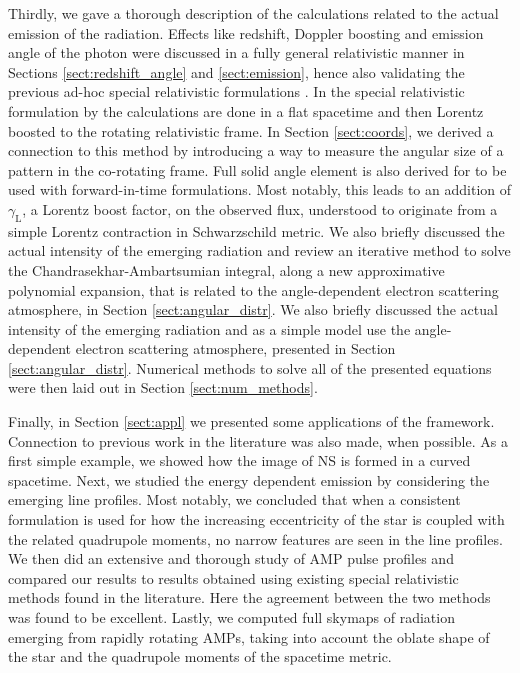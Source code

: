 \documentclass{aa}
\newcommand{\sch}{Schwarzschild }
\newcommand{\lgamma}{\gamma_{\text{L}}}
\begin{document}
Thirdly, we gave a thorough description of the calculations related to the actual emission of the radiation.
Effects like redshift, Doppler boosting and emission angle of the photon were discussed in a fully general relativistic manner in Sections \ref{sect:redshift_angle} and \ref{sect:emission}, hence also validating the previous ad-hoc special relativistic formulations \citep[see e.g.][]{PG03, PB06}.
In the special relativistic formulation by \citet{PB06} the calculations are done in a flat spacetime and then Lorentz boosted to the rotating relativistic frame.
In Section \ref{sect:coords}, we derived a connection to this method by introducing a way to measure the angular size of a pattern in the co-rotating frame.
Full solid angle element is also derived for to be used with forward-in-time formulations.
Most notably, this leads to an addition of $\lgamma$, a Lorentz boost factor, on the observed flux, understood to originate from a simple Lorentz contraction in \sch metric.
We also briefly discussed the actual intensity of the emerging radiation and review an iterative method to solve the Chandrasekhar-Ambartsumian integral, along a new approximative polynomial expansion, that is related to the angle-dependent electron scattering atmosphere, in Section \ref{sect:angular_distr}.
We also briefly discussed the actual intensity of the emerging radiation and as a simple model use the angle-dependent electron scattering atmosphere, presented in Section \ref{sect:angular_distr}.
Numerical methods to solve all of the presented equations were then laid out in Section \ref{sect:num_methods}.

Finally, in Section \ref{sect:appl} we presented some applications of the framework.
Connection to previous work in the literature was also made, when possible.
As a first simple example, we showed how the image of NS is formed in a curved spacetime.
Next, we studied the energy dependent emission by considering the emerging line profiles.
Most notably, we concluded that when a consistent formulation is used for how the increasing eccentricity of the star is coupled with the related quadrupole moments, no narrow features are seen in the line profiles.
We then did an extensive and thorough study of AMP pulse profiles and compared our results to results obtained using existing special relativistic methods found in the literature.
Here the agreement between the two methods was found to be excellent.
Lastly, we computed full skymaps of radiation emerging from rapidly rotating AMPs, taking into account the oblate shape of the star and the quadrupole moments of the spacetime metric.
\end{document}
